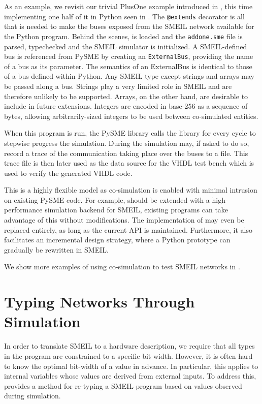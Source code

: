 As an example, we revisit our trivial PlusOne example introduced in
, this time implementing one half of it in Python seen in
. The \texttt{@extends} decorator is all that is needed to
make the buses exposed from the SMEIL network available for the Python
program. Behind the scenes, \libsme{} is loaded and the \texttt{addone.sme} file
is parsed, typechecked and the \libsme{} SMEIL simulator is initialized. A
SMEIL-defined bus is referenced from PySME by creating an \texttt{ExternalBus},
providing the name of a bus as its parameter. The semantics of an {\ttfamily
  ExternalBus} is identical to those of a bus defined within Python. Any SMEIL
type except strings and arrays may be passed along a bus. Strings play a very
limited role in SMEIL and are therefore unlikely to be supported. Arrays, on the
other hand, are desirable to include in future extensions. Integers are encoded
in base-256 as a sequence of bytes, allowing arbitrarily-sized integers to be
used between co-simulated entities.

When this program is run, the PySME library calls the \libsme{} library for
every cycle to stepwise progress the simulation. During the simulation \libsme{}
may, if asked to do so, record a trace of the communication taking place over
the buses to a file. This trace file is then later used as the data source for
the VHDL test bench which is used to verify the generated VHDL code.

This is a highly flexible model as co-simulation is enabled with minimal
intrusion on existing PySME code. For example, should \libsme{} be extended with
a high-performance simulation backend for SMEIL, existing programs can take
advantage of this without modifications. The implementation of \libsme{} may
even be replaced entirely, as long as the current API is
maintained. Furthermore, it also facilitates an incremental design strategy,
where a Python prototype can gradually be rewritten in SMEIL.

We show more examples of using co-simulation to test SMEIL networks in
.



\section{Typing Networks Through Simulation}
\label{sec:typing}
In order to translate SMEIL to a hardware
description, we require that all types in the program are constrained to a
specific bit-width. However, it is often hard to know the optimal bit-width of a
value in advance. In particular, this applies to internal variables whose values
are derived from external inputs. To address this, \libsme{} provides a method
for re-typing a SMEIL program based on values observed during simulation.

